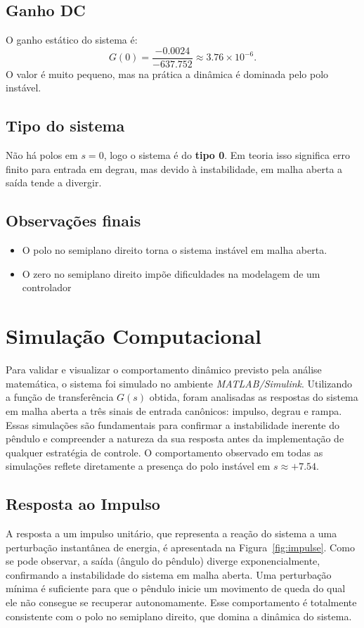 \documentclass[9pt,a4paper,twocolumn,twoside]{tau-class/tau}
\begin{document}
\subsection{Ganho DC}
O ganho estático do sistema é:
\[
G(0)=\frac{-0.0024}{-637.752}\approx 3.76\times 10^{-6}.
\]
O valor é muito pequeno, mas na prática a dinâmica é dominada pelo polo instável.

\subsection{Tipo do sistema}
Não há polos em $s=0$, logo o sistema é do \textbf{tipo 0}. Em teoria isso significa erro finito para entrada em degrau, mas devido à instabilidade, em malha aberta a saída tende a divergir.

\subsection{Observações finais}
\begin{itemize}
    \item O polo no semiplano direito torna o sistema instável em malha aberta.
    \item O zero no semiplano direito impõe dificuldades na modelagem de um controlador 
\end{itemize}

\section{Simulação Computacional}
Para validar e visualizar o comportamento dinâmico previsto pela análise matemática, o sistema foi simulado no ambiente \textit{MATLAB/Simulink}. Utilizando a função de transferência \(G(s)\) obtida, foram analisadas as respostas do sistema em malha aberta a três sinais de entrada canônicos: impulso, degrau e rampa. Essas simulações são fundamentais para confirmar a instabilidade inerente do pêndulo e compreender a natureza da sua resposta antes da implementação de qualquer estratégia de controle. O comportamento observado em todas as simulações reflete diretamente a presença do polo instável em \(s \approx +7.54\).

\subsection{Resposta ao Impulso}
A resposta a um impulso unitário, que representa a reação do sistema a uma perturbação instantânea de energia, é apresentada na Figura~\ref{fig:impulse}. Como se pode observar, a saída (ângulo do pêndulo) diverge exponencialmente, confirmando a instabilidade do sistema em malha aberta. Uma perturbação mínima é suficiente para que o pêndulo inicie um movimento de queda do qual ele não consegue se recuperar autonomamente. Esse comportamento é totalmente consistente com o polo no semiplano direito, que domina a dinâmica do sistema.
\end{document}
